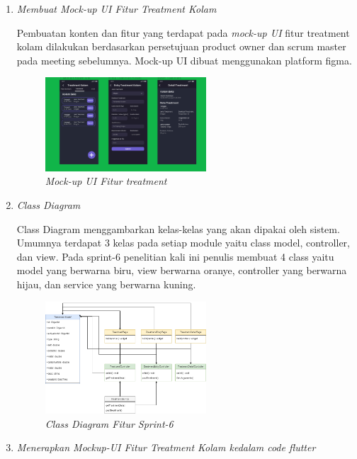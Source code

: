 \begin{enumerate}[listparindent=2em]
	
	\item{\textit{Membuat Mock-up UI Fitur Treatment Kolam}}
	
	Pembuatan konten dan fitur yang terdapat pada \textit{mock-up UI} fitur treatment kolam dilakukan berdasarkan persetujuan product owner dan scrum master pada meeting sebelumnya. Mock-up UI dibuat menggunakan platform figma.
	
	\begin{figure}[H]
	\centering
	\includegraphics[keepaspectratio, width=6cm]{gambar/mockuptreatment}
	\caption{\textit{Mock-up UI Fitur treatment}}
	\label{gambar:mockuptreatment}
	\end{figure}

	\item{\textit{Class Diagram}}
	
	Class Diagram menggambarkan kelas-kelas yang akan dipakai oleh sistem. Umumnya terdapat 3 kelas pada setiap module yaitu class model, controller, dan view. Pada sprint-6 penelitian kali ini penulis membuat 4 class yaitu model yang berwarna biru, view berwarna oranye, controller yang berwarna hijau, dan service yang berwarna kuning.
	 
	 \begin{figure}[H]
	 \centering
	 \includegraphics[keepaspectratio, width=6cm]{gambar/treatmentcd}
	 \caption{\textit{Class Diagram Fitur Sprint-6}}
	 \label{gambar:treatmentcd}
	 \end{figure}

	\item{\textit{Menerapkan Mockup-UI Fitur Treatment Kolam kedalam code flutter}}
	

\end{enumerate}
